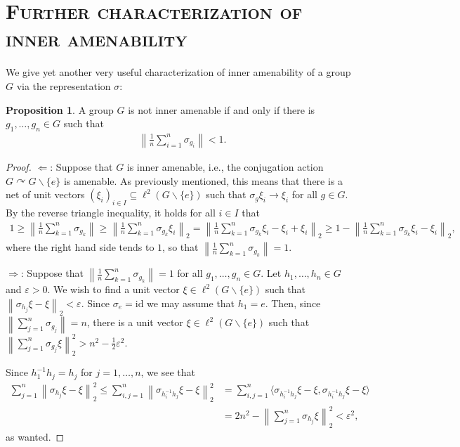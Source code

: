 \documentclass[10pt,oneside,openany,final]{memoir}
\newcommand{\ssection}[1]{%
\newpage%
\section[#1]{\centering\normalfont\scshape \textbf{#1}}}
\theoremstyle{definition}
\newtheorem{proposition}[theorem]{Proposition}
\theoremstyle{Break}
\newcommand{\lv}{\left\lVert}
\newcommand{\rv}{\right\rVert}
\def\acts{\curvearrowright}
\begin{document}
\ssection{Further characterization of inner amenability}
We give yet another very useful characterization of inner amenability of a group $G$ via the representation $\sigma$:
\begin{proposition}
	A group $G$ is not inner amenable if and only if there is $g_1,\dots,g_n \in G$ such that 
	\begin{align*}
		\lv \frac{1}{n}\sum_{i=1}^n \sigma_{g_i}\rv < 1.
	\end{align*}
\end{proposition}
\begin{proof}
	$\Leftarrow$: Suppose that $G$ is inner amenable, i.e., the conjugation action $G \acts G\backslash\{e\}$ is amenable. As previously mentioned, this means that there is a net of unit vectors $(\xi_i)_{i \in I} \subseteq \ell^2(G\backslash\{e\})$ such that $\sigma_g \xi_i \to \xi_i$ for all $g \in G$. By the reverse triangle inequality, it holds for all $i \in I$ that
	\begin{align*}
		1 \geq \lv \frac{1}{n} \sum_{k=1}^{n}\sigma_{g_k} \rv\geq \lv \frac{1}{n} \sum_{k=1}^{n}\sigma_{g_k} \xi_i \rv_{2} = \lv \frac{1}{n} \sum_{k=1}^{n}\sigma_{g_k}\xi_i-\xi_i+\xi_i\rv_2 \geq 1- \lv \frac{1}{n} \sum_{k=1}^{n} \sigma_{g_k}\xi_i-\xi_i\rv_2,
	\end{align*}
	where the right hand side tends to $1$, so that $\lv \frac{1}{n} \sum_{k=1}^{n} \sigma_{g_k}\rv=1$. 

	$\Rightarrow$: Suppose that $\lv \frac{1}{n} \sum_{k=1}^{n} \sigma_{g_k}\rv = 1$ for all $ g_1,\dots,g_n \in G$. Let $h_1,\dots,h_n \in G$ and $\varepsilon>0$. We wish to find a unit vector $\xi \in \ell^2(G\backslash\{e\})$ such that $\lv\sigma_{h_j} \xi - \xi \rv_2 < \varepsilon$. Since $\sigma_e=\mathrm{id}$ we may assume that $h_1=e$. Then, since $\lv \sum_{j=1}^n \sigma_{g_j}\rv = n$, there is a unit vector $\xi \in \ell^2(G\backslash\{e\})$ such that $\lv \sum_{j=1}^{n}\sigma_{g_j} \xi \rv_2^2 > n^2 - \frac{1}{2}\varepsilon^2$. 
	
	Since $h_1^{-1}h_j=h_j$ for $j=1,\dots,n$, we see that
\begin{align*}
	\sum_{j=1}^{n} \lv \sigma_{h_j}\xi - \xi\rv_2^2 \leq \sum_{i,j=1}^n \lv \sigma_{h_{i}^{-1}h_j}\xi-\xi\rv_2^2 &= \sum_{i,j=1}^n \langle \sigma_{h_{i}^{-1}h_j}\xi-\xi,\sigma_{h_{i}^{-1}h_j}\xi-\xi \rangle\\
	&=2n^2 - \lv \sum_{j=1}^n \sigma_{h_j}\xi \rv_2^2 < \varepsilon^2,
\end{align*}
as wanted.
\end{proof}
\end{document}
